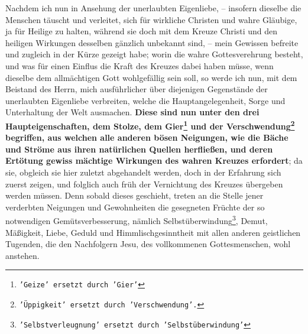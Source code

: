 Nachdem ich nun in Ansehung der unerlaubten Eigenliebe, -- insofern dieselbe die
Menschen täuscht und verleitet, sich für wirkliche Christen und wahre Gläubige,
ja für Heilige zu halten, während sie doch mit dem Kreuze Christi und den
heiligen Wirkungen desselben gänzlich unbekannt sind, -- mein Gewissen befreite
und zugleich in der Kürze gezeigt habe;
worin die wahre Gottesverehrung
besteht, und was für einen Einflus die Kraft des Kreuzes dabei haben müsse,
wenn dieselbe dem allmächtigen Gott wohlgefällig sein soll, so werde ich nun,
mit dem Beistand des Herrn, mich ausführlicher über diejenigen Gegenstände der
unerlaubten Eigenliebe  verbreiten, welche die
Hauptangelegenheit, Sorge und
Unterhaltung der Welt ausmachen.\label{ref:07_01_drei_haupteigenschaften}
\textbf{Diese sind nun unter den drei
Haupteigenschaften, dem Stolze, dem Gier\footnote{\texttt{'Geize'
ersetzt durch 'Gier'}} und der
Verschwendung\footnote{\texttt{'Üppigkeit' ersetzt durch 'Verschwendung'.}}
 begriffen, aus
welchen alle anderen bösen Neigungen, wie die Bäche und Ströme aus ihren
natürlichen Quellen herfließen, und deren Ertötung gewiss mächtige Wirkungen
des wahren Kreuzes erfordert}; da sie, obgleich sie hier zuletzt abgehandelt
werden, doch in der Erfahrung sich zuerst zeigen, und folglich auch früh der
Vernichtung des Kreuzes übergeben werden müssen. Denn sobald dieses geschieht,
treten an die Stelle jener verderbten Neigungen und Gewohnheiten die gesegneten
Früchte der so notwendigen Gemütsverbesserung, nämlich
Selbstüberwindung\footnote{\texttt{'Selbstverleugnung' ersetzt durch
'Selbstüberwindung'}},
Demut, Mäßigkeit, Liebe,
Geduld und Himmlischgesinntheit mit allen anderen
geistlichen Tugenden, die den Nachfolgern Jesu, des vollkommenen
Gottesmenschen,
wohl anstehen.

\medskip

